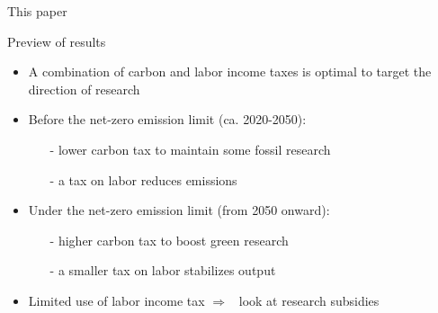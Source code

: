\documentclass[11pt,aspectratio=169]{beamer}
\newcommand{\tr}[1]{\textcolor{blue}{#1}}
\newcommand{\ar}{$\Rightarrow$ \ }
\begin{document}
\begin{frame}{This paper}
{\begin{tikzpicture}
		\end{tikzpicture}
	}
	\end{frame}
	
	
	\begin{frame}{Preview of results}
		\centering
		\vspace{-3mm}
		\begin{itemize}[<+-| alert@+>]
			\item A combination of carbon and labor income taxes is optimal to target the direction of research
			\vspace{3mm}
			\item Before the net-zero emission limit (ca. 2020-2050): 
			\begin{itemize}
				\item[-] lower carbon tax to maintain some fossil research %
				\item[-] a tax on labor reduces emissions
			\end{itemize}
			\vspace{3mm}
			\item Under the net-zero emission limit (from 2050 onward): 
			\begin{itemize}
				\item[-]  higher carbon tax to boost green research
				\item[-]  a smaller tax on labor stabilizes output
			\end{itemize}
			\vspace{3mm}
			\item Limited use of labor income tax \ar look at research subsidies
	\end{itemize}
\end{frame}
\end{document}
